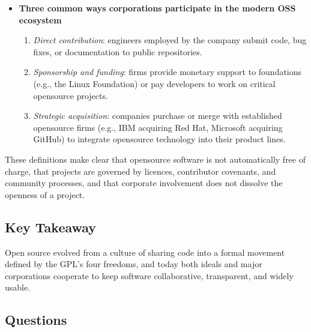\documentclass[12pt, a4paper]{article}
\begin{document}
\begin{itemize}
    \begin{itemize}
      \item \textit{Free Software} (as advocated by the FSF) stresses the ethical claim that software users should have the four freedoms above; the word ``free'' refers to liberty, not price. 
      \item \textit{Open Source} (as promoted by the OSI) highlights practical advantages---such as faster development, higher quality, and reduced cost---while accepting the same licences that grant the four freedoms.  Thus the two terms describe the same set of licences but from different motivational angles. 
    \end{itemize}
  \item \textbf{Three common ways corporations participate in the modern OSS ecosystem}\\
    \begin{enumerate}
      \item \textit{Direct contribution}: engineers employed by the company submit code, bug fixes, or documentation to public repositories. 
      \item \textit{Sponsorship and funding}: firms provide monetary support to foundations (e.g., the Linux Foundation) or pay developers to work on critical opensource projects. 
      \item \textit{Strategic acquisition}: companies purchase or merge with established opensource firms (e.g., IBM acquiring Red Hat, Microsoft acquiring GitHub) to integrate opensource technology into their product lines. 
    \end{enumerate}
\end{itemize}

These definitions make clear that opensource software is not automatically free of charge, that projects are governed by licences, contributor covenants, and community processes, and that corporate involvement does not dissolve the openness of a project.

\subsection{Key Takeaway}
Open source evolved from a culture of sharing code into a formal movement defined by the GPL's four freedoms, and today both ideals and major corporations cooperate to keep software collaborative, transparent, and widely usable.

\subsection{Questions}
\end{document}
